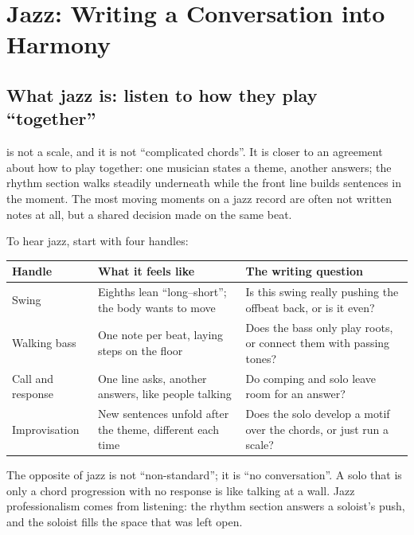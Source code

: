 \chapter{Jazz: Writing a Conversation into Harmony}
\label{ch:genre-jazz-deep}


\section{What jazz is: listen to how they play ``together''}
\label{sec:jazz-what}

 is not a scale, and it is not ``complicated chords''. It is closer to an agreement about how to play together: one musician states a theme, another answers; the rhythm section walks steadily underneath while the front line builds sentences in the moment. The most moving moments on a jazz record are often not written notes at all, but a shared decision made on the same beat.

To hear jazz, start with four handles:

\begin{longtable}{p{}p{}p{}}
\toprule
Handle & What it feels like & The writing question \\
\midrule
Swing & Eighths lean ``long--short''; the body wants to move & Is this swing really pushing the offbeat back, or is it even? \\
Walking bass & One note per beat, laying steps on the floor & Does the bass only play roots, or connect them with passing tones? \\
Call and response & One line asks, another answers, like people talking & Do comping and solo leave room for an answer? \\
Improvisation & New sentences unfold after the theme, different each time & Does the solo develop a motif over the chords, or just run a scale? \\
\bottomrule
\end{longtable}

The opposite of jazz is not ``non-standard''; it is ``no conversation''. A solo that is only a chord progression with no response is like talking at a wall. Jazz professionalism comes from listening: the rhythm section answers a soloist's push, and the soloist fills the space that was left open.

